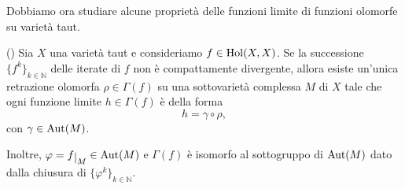 Dobbiamo ora studiare alcune proprietà delle funzioni limite di funzioni olomorfe su varietà taut.

\begin{thm} \label{retraiii}
    (\cite{A3}) Sia $X$ una varietà taut e consideriamo $f\in\textnormal{Hol}(X,X)$. Se la successione $\{f^k\}_{k\in\mathbb{N}}$ delle iterate di $f$ non è compattamente divergente, allora esiste un'unica retrazione olomorfa $\rho\in\Gamma(f)$ su una sottovarietà complessa $M$ di $X$ tale che ogni funzione limite $h\in\Gamma(f)$ è della forma
    $$h=\gamma\circ\rho,$$
    con $\gamma\in\textnormal{Aut}(M)$.

    Inoltre, $\varphi=f\restrict{M}\in\textnormal{Aut}(M)$ e $\Gamma(f)$ è isomorfo al sottogruppo di $\textnormal{Aut}(M)$ dato dalla chiusura di $\{\varphi^k\}_{k \in\mathbb{N}}$.
\end{thm}

